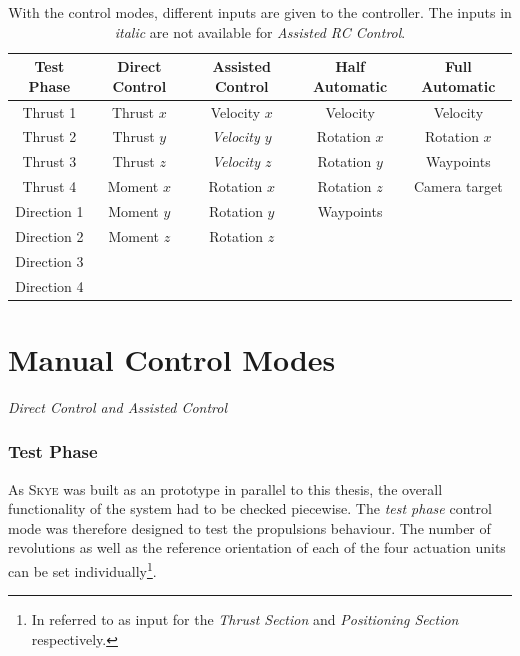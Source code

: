 \begin{table}[h]		%
	\begin{tabular}{c c c c c} %
	Test Phase 		& Direct Control 	& Assisted Control 	& Half Automatic	& Full Automatic  \\
	\toprule[1.25pt]				%
	Thrust 1		& Thrust $x$	& Velocity $x$	& Velocity	& Velocity	\\
	Thrust 2		& Thrust $y$	& \textit{Velocity $y$}	& Rotation $x$	& Rotation $x$\\
	Thrust 3		& Thrust $z$	& \textit{Velocity $z$}	& Rotation $y$	& Waypoints	\\
	Thrust 4		& Moment $x$	& Rotation $x$	& Rotation $z$	&	Camera target\\
	Direction 1		& Moment $y$	& Rotation $y$	& Waypoints	&	\\
	Direction 2		& Moment $z$	& Rotation $z$	&		&	\\
	Direction 3		& 		& 		&		&	\\
	Direction 4		& 		& 		&		&	\\

	\bottomrule[1.25pt]
	\end{tabular} 
	\caption[The different control modes]{With the control modes, different inputs are given to the controller. The inputs in \textit{italic} are not available for \textit{Assisted RC  Control}.}
	\label{tab:control_modes}
\end{table}

\section{Manual Control Modes}
\label{sec:manualControlModes}
\textit{Direct Control and Assisted Control}
\subsubsection{Test Phase} 
As \textsc{Skye} was built as an prototype in parallel to this thesis, the overall functionality of the system had to be checked piecewise. The \textit{test phase} control mode was therefore designed to test the propulsions behaviour. The number of revolutions as well as the reference orientation of each of the four actuation units can be set individually\footnote{In \cite{schaffnervu} referred to as input for the \textit{Thrust Section} and \textit{Positioning Section} respectively.}.

